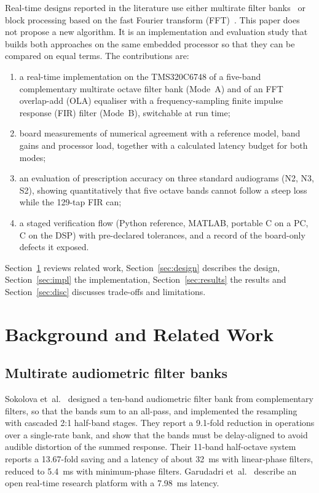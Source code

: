 \documentclass[conference]{IEEEtran}
\begin{document}
Real-time designs reported in the literature use either multirate filter banks~\cite{sokolova2021,sokolova2022,yang2016} or block processing based on the fast Fourier transform (FFT)~\cite{kayser2022}. This paper does not propose a new algorithm. It is an implementation and evaluation study that builds both approaches on the same embedded processor so that they can be compared on equal terms. The contributions are:
\begin{enumerate}
\item a real-time implementation on the TMS320C6748 of a five-band complementary multirate octave filter bank (Mode~A) and of an FFT overlap-add (OLA) equaliser with a frequency-sampling finite impulse response (FIR) filter (Mode~B), switchable at run time;
\item board measurements of numerical agreement with a reference model, band gains and processor load, together with a calculated latency budget for both modes;
\item an evaluation of prescription accuracy on three standard audiograms (N2, N3, S2), showing quantitatively that five octave bands cannot follow a steep loss while the 129-tap FIR can;
\item a staged verification flow (Python reference, MATLAB, portable C on a PC, C on the DSP) with pre-declared tolerances, and a record of the board-only defects it exposed.
\end{enumerate}
Section~\ref{sec:bg} reviews related work, Section~\ref{sec:design} describes the design, Section~\ref{sec:impl} the implementation, Section~\ref{sec:results} the results and Section~\ref{sec:disc} discusses trade-offs and limitations.

\section{Background and Related Work}\label{sec:bg}
\subsection{Multirate audiometric filter banks}
Sokolova et~al.~\cite{sokolova2021} designed a ten-band audiometric filter bank from complementary filters, so that the bands sum to an all-pass, and implemented the resampling with cascaded 2:1 half-band stages. They report a 9.1-fold reduction in operations over a single-rate bank, and show that the bands must be delay-aligned to avoid audible distortion of the summed response. Their 11-band half-octave system~\cite{sokolova2022,garudadri2026patent} reports a 13.67-fold saving and a latency of about 32~ms with linear-phase filters, reduced to 5.4~ms with minimum-phase filters. Garudadri et~al.~\cite{garudadri2017} describe an open real-time research platform with a 7.98~ms latency.
\end{document}
